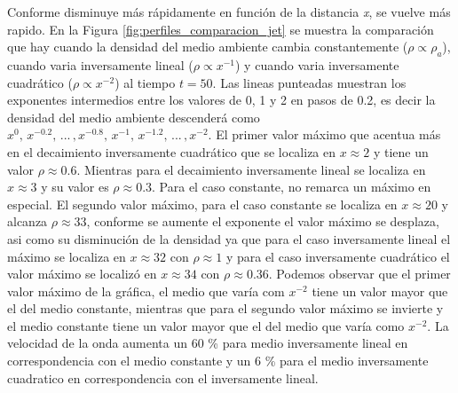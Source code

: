 \documentclass[12pt,a4paper]{book}
\begin{document}
Conforme disminuye más rápidamente en función de la distancia \emph{x}, 
se vuelve más rapido.
En la Figura \ref{fig:perfiles_comparacion_jet} se muestra la comparación que hay cuando la densidad del medio
ambiente cambia constantemente ($\rho \varpropto \rho_a$), cuando varia inversamente lineal ($\rho \varpropto x^{-1}$) y 
cuando varia inversamente cuadrático ($\rho \varpropto x^{-2}$) al tiempo $t = 50$. Las lineas
punteadas muestran los exponentes intermedios entre los valores de 0, 1 y 2 en pasos de 0.2, es decir la densidad
del medio ambiente descenderá como $x^0, \, x^{-0.2}, \, . . . \,  ,x^{-0.8} , \, x^{-1}  , \, x^{-1.2}
, \, . . . \,  , x^{-2}$.
El primer valor máximo que acentua más en el decaimiento inversamente cuadrático que se localiza en $x \approx 2$ y tiene
un valor $\rho \approx 0.6$. Mientras para el decaimiento inversamente lineal se localiza en $x \approx 3$ y su valor es 
$\rho  \approx  0.3$. Para el caso constante, no remarca un máximo en especial. El segundo valor máximo, 
para el caso 
constante se localiza en $x \approx 20$ y alcanza $\rho  \approx 33$, conforme se aumente el exponente el valor 
máximo se desplaza, asi como su disminución de la densidad ya que para el caso inversamente lineal el máximo se localiza 
en $x \approx 32$ con $\rho \approx 1$ y para el caso inversamente cuadrático el valor máximo se localizó en 
$x \approx 34$ con $\rho \approx 0.36 $.  Podemos observar que el primer valor máximo de la gráfica, el medio
que varía com $x^{-2}$ tiene un valor mayor que el del medio constante, mientras que para el segundo valor máximo se invierte
y el medio constante tiene un valor mayor que el del medio que varía como $x^{-2}$.
La velocidad de la onda aumenta un 60 \% para medio inversamente lineal en correspondencia con el medio constante y un 6 \%
para el medio inversamente cuadratico en correspondencia con el inversamente lineal.  
\end{document}
